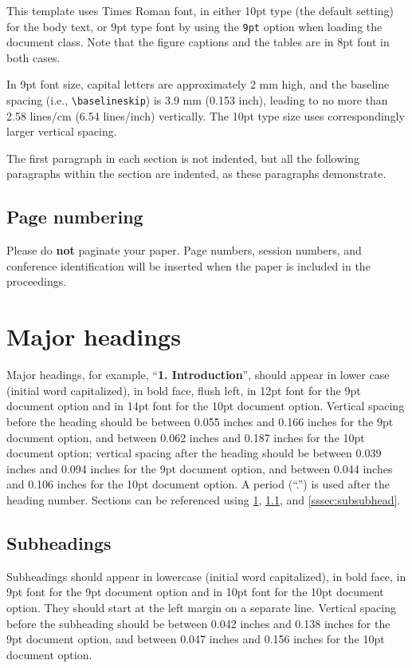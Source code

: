 \documentclass[9pt]{ieeeconf}
\begin{document}
This template uses Times Roman font, in either 10pt type (the default setting) for the body text, or 9pt type font by using the \texttt{9pt} option when loading the document class. Note that the figure captions and the tables are in 8pt font in both cases.

In 9pt font size, capital letters are approximately 2 mm high, and the baseline spacing (i.e., \texttt{\textbackslash{baselineskip}}) is 3.9 mm (0.153 inch), leading to no more than 2.58 lines/cm (6.54 lines/inch) vertically. The 10pt type size uses correspondingly larger vertical spacing.

The first paragraph in each section is not indented, but all the following paragraphs within the section are indented, as these paragraphs demonstrate.

\subsection{Page numbering}
\label{sec:page}

Please do {\bf not} paginate your paper. Page numbers, session numbers, and conference identification will be inserted when the paper is included in the proceedings.


\section{Major headings}
\label{sec:majhead}

Major headings, for example, ``{\bf 1. Introduction}'', should appear in lower case (initial word capitalized), in bold face, flush left, in 12pt font for the 9pt document option and in 14pt font for the 10pt document option. Vertical spacing before the heading should be between 0.055 inches and 0.166 inches for the 9pt document option, and between 0.062 inches and 0.187 inches for the 10pt document option; vertical spacing after the heading should be between 0.039 inches and 0.094 inches for the 9pt document option, and between 0.044 inches and 0.106 inches for the 10pt document option. A period (``.'') is used after the heading number. Sections can be referenced using \cref{sec:majhead}, \cref{ssec:subhead}, and \cref{sssec:subsubhead}.

\subsection{Subheadings}
\label{ssec:subhead}

Subheadings should appear in lowercase (initial word capitalized), in bold face, in 9pt font for the 9pt document option and in 10pt font for the 10pt document option. They should start at the left margin on a separate line. Vertical spacing before the subheading should be between 0.042 inches and 0.138 inches for the 9pt document option, and between 0.047 inches and 0.156 inches for the 10pt document option.
\end{document}
